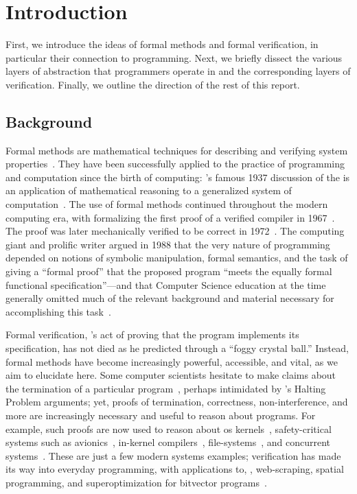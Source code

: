 \section{Introduction}

First, we introduce the ideas of formal methods and formal verification, in
particular their connection to programming. Next, we briefly dissect the various
layers of abstraction that programmers operate in and the corresponding
layers of verification. Finally, we outline the direction of the rest of this
report.

\subsection{Background}\label{S:background}

Formal methods are mathematical techniques for describing and verifying system
properties~\cite{Wing_90}. They have been successfully applied to the practice
of programming and computation since the birth of computing:
\citeauthor{Turing_1937}'s famous 1937 discussion of the {\haltprob} is an
application of mathematical reasoning to a generalized system of
computation~\cite{Turing_1937}. The use of formal methods continued throughout
the modern computing era, with \citeauthor{McCarthy_67} formalizing the first
proof of a verified compiler in 1967~\cite{McCarthy_67}. The proof was later
mechanically verified to be correct in 1972~\cite{Milner_72}. The computing
giant and prolific writer \citeauthor{EWD:EWD1036} argued in 1988 that the very
nature of programming depended on notions of symbolic manipulation, formal
semantics, and the task of giving a ``formal proof'' that the proposed program
``meets the equally formal functional specification''---and that Computer
Science education at the time generally omitted much of the relevant background
and material necessary for accomplishing this task~\cite{EWD:EWD1036}.

Formal verification, \citeauthor{EWD:EWD1036}'s act of proving that the program
implements its specification, has not died as he predicted through a ``foggy
crystal ball.'' Instead, formal methods have become increasingly powerful,
accessible, and vital, as we aim to elucidate here. Some computer scientists
hesitate to make claims about the termination of a particular
program~\cite{Cook_2011}, perhaps intimidated by \citeauthor{Turing_1937}'s
Halting Problem arguments; yet, proofs of termination, correctness,
non-interference, and more are increasingly necessary and useful to reason about
programs. For example, such proofs are now used to reason about \gls{os}
kernels~\cite{Klein_EHACDEEKNSTW_09,Klein_AEHCDEEKNSTW_10,Klein_AEMSKH_14,Sewell_KH_16,Narayanan_2019,Narayan_2020,Nelson_2017},
safety-critical systems such as avionics~\cite[\S 1]{Leroy-Compcert-CACM},
in-kernel compilers~\cite{186144,258848}, file-systems~\cite{Zou_2019}, and
concurrent systems~\cite{222565,222621}. These are just a few modern systems
examples; verification has made its way into everyday programming, with
applications to, \eg, web-scraping, spatial programming, and superoptimization
for bitvector programs~\cite[\S 4]{Torlak_2013}.

